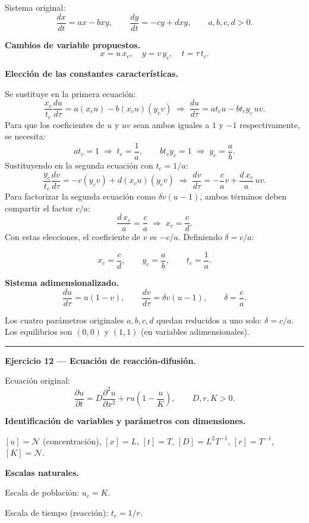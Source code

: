 \documentclass[12pt,letterpaper]{article}
\begin{document}
Sistema original:
\[
  \frac{dx}{dt}=ax-bxy,\qquad
  \frac{dy}{dt}=-cy+dxy,\qquad a,b,c,d>0.
\]

\textbf{Cambios de variable propuestos.}
\[
  x=u\,x_c,\quad y=v\,y_c,\quad t=\tau\,t_c.
\]

\textbf{Elección de las constantes características.}

Se sustituye en la primera ecuación:
\[
  \frac{x_c}{t_c}\frac{du}{d\tau}=a(x_c u)-b(x_c u)(y_c v)
  \;\Longrightarrow\;
  \frac{du}{d\tau}=at_c u - bt_c y_c\,uv.
\]
Para que los coeficientes de $u$ y $uv$ sean ambos iguales a $1$ y
$-1$ respectivamente, se necesita:
\[
  at_c=1 \;\Rightarrow\; t_c=\frac{1}{a},
  \qquad
  bt_c y_c=1 \;\Rightarrow\; y_c=\frac{a}{b}.
\]
Sustituyendo en la segunda ecuación con $t_c=1/a$:
\[
  \frac{y_c}{t_c}\frac{dv}{d\tau}=-c(y_c v)+d(x_c u)(y_c v)
  \;\Longrightarrow\;
  \frac{dv}{d\tau}=-\frac{c}{a}v+\frac{d\,x_c}{a}\,uv.
\]
Para factorizar la segunda ecuación como $\delta v(u-1)$, ambos términos
deben compartir el factor $c/a$:
\[
  \frac{d\,x_c}{a}=\frac{c}{a} \;\Rightarrow\; x_c=\frac{c}{d}.
\]
Con estas elecciones, el coeficiente de $v$ es $-c/a$. Definiendo $\delta=c/a$:

\[
  \boxed{
    x_c=\frac{c}{d},\qquad y_c=\frac{a}{b},\qquad t_c=\frac{1}{a}.
  }
\]

\textbf{Sistema adimensionalizado.}
\[
  \boxed{
    \frac{du}{d\tau}=u(1-v),\qquad
    \frac{dv}{d\tau}=\delta v(u-1),\qquad
    \delta=\frac{c}{a}.
  }
\]

Los cuatro parámetros originales $a,b,c,d$ quedan reducidos a uno solo: $\delta=c/a$.
Los equilibrios son $(0,0)$ y $(1,1)$ (en variables adimensionales).

\bigskip
\noindent\rule{\textwidth}{0.3pt}
\bigskip

\noindent\textbf{Ejercicio 12 — Ecuación de reacción-difusión.}

Ecuación original:
\[
  \frac{\partial u}{\partial t}=D\frac{\partial^2 u}{\partial x^2}+ru\!\left(1-\frac{u}{K}\right),
  \qquad D,r,K>0.
\]

\textbf{Identificación de variables y parámetros con dimensiones.}

$[u]=\mathcal{N}$ (concentración), $[x]=L$, $[t]=T$, $[D]=L^2T^{-1}$,
$[r]=T^{-1}$, $[K]=\mathcal{N}$.

\textbf{Escalas naturales.}

Escala de población: $u_c=K$.

Escala de tiempo (reacción): $t_c=1/r$.
\end{document}
